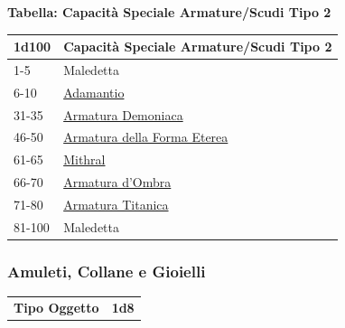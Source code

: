\begin{multicols}{2}
{%

\textbf{Tabella: Capacità Speciale Armature/Scudi Tipo 2}\hypertarget{Capacità Speciale Armature / Scudi Tipo 2}{}

\medskip

{\small\begin{tabularx}{0.45\textwidth}{lX}
		\toprule
\textbf{1d100} & \textbf{Capacità Speciale Armature/Scudi Tipo 2}\\
\toprule
1-5 & Maledetta\\
6-10 &\hyperlink{Adamantio}{Adamantio}\\
31-35& \hyperlink{Armatura Demoniaca}{Armatura Demoniaca}\\
46-50& \hyperlink{Armatura della Forma Eterea}{Armatura della Forma Eterea}\\
61-65 &\hyperlink{Mithral}{Mithral}\\
66-70 &\hyperlink{Armatura d'Ombra}{Armatura d'Ombra}\\
71-80 &\hyperlink{Armatura Titanica}{Armatura Titanica}\\
81-100 & Maledetta\\
\end{tabularx}}

\subsubsection{Amuleti, Collane e Gioielli}\hypertarget{amuleticollanegioielli}{}\label{amuleticollanegioielli}

{\small\begin{tabular}{ll}
\textbf{Tipo Oggetto}&\textbf{1d8}\\
\end{tabular}}

\medskip\hypertarget{amuleticollanegioielli1}{}

}
\end{multicols}
